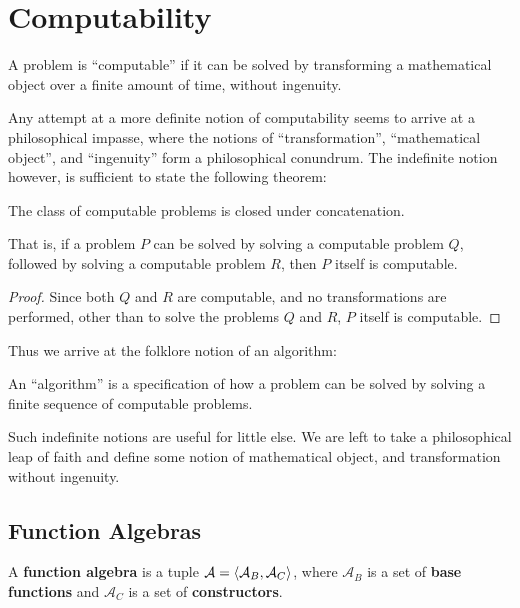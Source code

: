 
\chapter{Computability}

\begin{notion} A problem is ``computable'' if it can be solved by transforming
a mathematical object over a finite amount of time, without ingenuity.
\end{notion}

Any attempt at a more definite notion of computability seems to arrive at a
philosophical impasse, where the notions of ``transformation'', ``mathematical
object'', and ``ingenuity'' form a philosophical conundrum. The indefinite
notion however, is sufficient to state the following theorem:

\begin{theorem} The class of computable problems is closed under
concatenation.\end{theorem}

That is, if a problem $P$ can be solved by solving a computable problem $Q$,
followed by solving a computable problem $R$, then $P$ itself is computable.

\begin{proof} Since both $Q$ and $R$ are computable, and no transformations are
performed, other than to solve the problems $Q$ and $R$, $P$ itself is
computable.\end{proof}

Thus we arrive at the folklore notion of an algorithm:

\begin{notion} An ``algorithm'' is a specification of how a problem can be
solved by solving a finite sequence of computable problems.\end{notion}

Such indefinite notions are useful for little else. We are left to take a
philosophical leap of faith and define some notion of mathematical object, and
transformation without ingenuity.

\section{Function Algebras}

\begin{definition} A \textbf{function algebra} is a tuple
$\mathcal{A}=\left\langle{\mathcal{A}_B,\mathcal{A}_C}\right\rangle$, where $\mathcal{A}_B$ is a
set of \textbf{base functions} and $\mathcal{A}_C$ is a set of
\textbf{constructors}. \end{definition}

